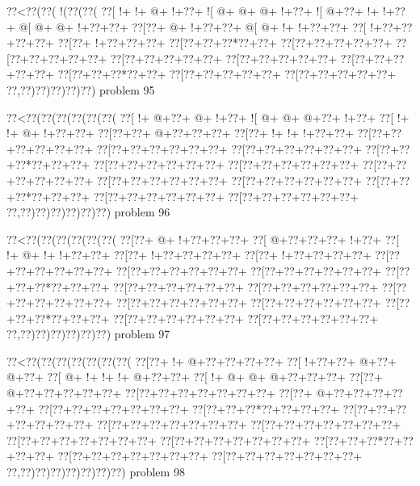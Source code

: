 \vbox{\vbox{\goo
\0??<\0??(\0??(\- !(\0??(\0??(
\0??[\- !+\- !+\- @+\- !+\0??+
\- ![\- @+\- @+\- @+\- !+\0??+
\- ![\- @+\0??+\- !+\- !+\0??+
\- @[\- @+\- @+\- !+\0??+\0??+
\0??[\0??+\- @+\- !+\0??+\0??+
\- @[\- @+\- !+\- !+\0??+\0??+
\0??[\- !+\0??+\0??+\0??+\0??+
\0??[\0??+\- !+\0??+\0??+\0??+
\0??[\0??+\0??+\0??*\0??+\0??+
\0??[\0??+\0??+\0??+\0??+\0??+
\0??[\0??+\0??+\0??+\0??+\0??+
\0??[\0??+\0??+\0??+\0??+\0??+
\0??[\0??+\0??+\0??+\0??+\0??+
\0??[\0??+\0??+\0??+\0??+\0??+
\0??[\0??+\0??+\0??*\0??+\0??+
\0??[\0??+\0??+\0??+\0??+\0??+
\0??[\0??+\0??+\0??+\0??+\0??+
\0??,\0??)\0??)\0??)\0??)\0??)
}
\hfil problem 95\hfil\break
}

\vbox{\vbox{\goo
\0??<\0??(\0??(\0??(\0??(\0??(\0??(
\0??[\- !+\- @+\0??+\- @+\- !+\0??+
\- ![\- @+\- @+\- @+\0??+\- !+\0??+
\0??[\- !+\- !+\- @+\- !+\0??+\0??+
\0??[\0??+\0??+\- @+\0??+\0??+\0??+
\0??[\0??+\- !+\- !+\- !+\0??+\0??+
\0??[\0??+\0??+\0??+\0??+\0??+\0??+
\0??[\0??+\0??+\0??+\0??+\0??+\0??+
\0??[\0??+\0??+\0??+\0??+\0??+\0??+
\0??[\0??+\0??+\0??*\0??+\0??+\0??+
\0??[\0??+\0??+\0??+\0??+\0??+\0??+
\0??[\0??+\0??+\0??+\0??+\0??+\0??+
\0??[\0??+\0??+\0??+\0??+\0??+\0??+
\0??[\0??+\0??+\0??+\0??+\0??+\0??+
\0??[\0??+\0??+\0??+\0??+\0??+\0??+
\0??[\0??+\0??+\0??*\0??+\0??+\0??+
\0??[\0??+\0??+\0??+\0??+\0??+\0??+
\0??[\0??+\0??+\0??+\0??+\0??+\0??+
\0??,\0??)\0??)\0??)\0??)\0??)\0??)
}
\hfil problem 96\hfil\break
}

\vbox{\vbox{\goo
\0??<\0??(\0??(\0??(\0??(\0??(\0??(
\0??[\0??+\- @+\- !+\0??+\0??+\0??+
\0??[\- @+\0??+\0??+\0??+\- !+\0??+
\0??[\- !+\- @+\- !+\- !+\0??+\0??+
\0??[\0??+\- !+\0??+\0??+\0??+\0??+
\0??[\0??+\- !+\0??+\0??+\0??+\0??+
\0??[\0??+\0??+\0??+\0??+\0??+\0??+
\0??[\0??+\0??+\0??+\0??+\0??+\0??+
\0??[\0??+\0??+\0??+\0??+\0??+\0??+
\0??[\0??+\0??+\0??*\0??+\0??+\0??+
\0??[\0??+\0??+\0??+\0??+\0??+\0??+
\0??[\0??+\0??+\0??+\0??+\0??+\0??+
\0??[\0??+\0??+\0??+\0??+\0??+\0??+
\0??[\0??+\0??+\0??+\0??+\0??+\0??+
\0??[\0??+\0??+\0??+\0??+\0??+\0??+
\0??[\0??+\0??+\0??*\0??+\0??+\0??+
\0??[\0??+\0??+\0??+\0??+\0??+\0??+
\0??[\0??+\0??+\0??+\0??+\0??+\0??+
\0??,\0??)\0??)\0??)\0??)\0??)\0??)
}
\hfil problem 97\hfil\break
}

\vbox{\vbox{\goo
\0??<\0??(\0??(\0??(\0??(\0??(\0??(\0??(
\0??[\0??+\- !+\- @+\0??+\0??+\0??+\0??+
\0??[\- !+\0??+\0??+\- @+\0??+\- @+\0??+
\0??[\- @+\- !+\- !+\- !+\- @+\0??+\0??+
\0??[\- !+\- @+\- @+\- @+\0??+\0??+\0??+
\0??[\0??+\- @+\0??+\0??+\0??+\0??+\0??+
\0??[\0??+\0??+\0??+\0??+\0??+\0??+\0??+
\0??[\0??+\- @+\0??+\0??+\0??+\0??+\0??+
\0??[\0??+\0??+\0??+\0??+\0??+\0??+\0??+
\0??[\0??+\0??+\0??*\0??+\0??+\0??+\0??+
\0??[\0??+\0??+\0??+\0??+\0??+\0??+\0??+
\0??[\0??+\0??+\0??+\0??+\0??+\0??+\0??+
\0??[\0??+\0??+\0??+\0??+\0??+\0??+\0??+
\0??[\0??+\0??+\0??+\0??+\0??+\0??+\0??+
\0??[\0??+\0??+\0??+\0??+\0??+\0??+\0??+
\0??[\0??+\0??+\0??*\0??+\0??+\0??+\0??+
\0??[\0??+\0??+\0??+\0??+\0??+\0??+\0??+
\0??[\0??+\0??+\0??+\0??+\0??+\0??+\0??+
\0??,\0??)\0??)\0??)\0??)\0??)\0??)\0??)
}
\hfil problem 98\hfil\break
}

